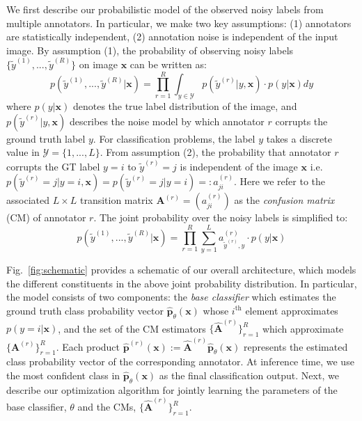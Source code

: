 We first describe our probabilistic model of the observed noisy labels from multiple annotators. In particular, we make two key assumptions: (1) annotators are statistically independent, (2) annotation noise is independent of the input image. By assumption (1), the probability of observing noisy labels $\{\tilde{y}^{(1)},...,\tilde{y}^{(R)}\}$ on image  $\textbf{x}$ can be written as:   
\begin{equation}\label{eq:general_likelihood}
p( \tilde{y}^{(1)},...,\tilde{y}^{(R)}|\textbf{x}) =  \prod_{r=1}^{R} \int_{y \in \mathcal{Y}}  p(\tilde{y}^{(r)}|y, \textbf{x}) \cdot p(y|\textbf{x}) dy
\end{equation}
where $p(y|\textbf{x})$ denotes the true label distribution of the image, and $ p(\tilde{y}^{(r)}|y, \textbf{x})$ describes the noise model by which annotator $r$ corrupts the ground truth label $y$. For classification problems, the label $y$ takes a discrete value in $\mathcal{Y}=\{1,...,L\}$.  From assumption (2), the probability that annotator  $r$ corrupts the GT label $y=i$ to $\tilde{y}^{(r)} = j$  is independent of the image $\mathbf{x}$ i.e. $ p(\tilde{y}^{(r)}=j|y=i, \textbf{x}) =  p(\tilde{y}^{(r)}=j|y=i) =: a^{(r)}_{ji} $. Here we refer to the associated $L \times L$ transition matrix $\mathbf{A}^{(r)} = (a^{(r)}_{ji}) $ as the \textit{confusion matrix} (CM) of annotator $r$. The joint probability over the noisy labels is simplified to: 
\begin{equation}\label{eq:model_likelihood}
p( \tilde{y}^{(1)},...,\tilde{y}^{(R)}|\textbf{x}) =  \prod_{r=1}^{R} \sum_{y = 1}^{L}  a^{(r)}_{\tilde{y}^{(r)}, y} \cdot p(y|\textbf{x})
\end{equation}

Fig.~\ref{fig:schematic} provides a schematic of our overall architecture, which models the different constituents in the above joint probability distribution. In particular, the model consists of two components: the \textit{base classifier} which estimates the ground truth class probability vector $\hat{\mathbf{p}}_{\theta}(\mathbf{x})$ whose $i^\text{th}$ element approximates $p(y=i|\textbf{x})$, and the set of the CM estimators $\{\hat{\mathbf{A}}^{(r)}\}_{r=1}^R$ which approximate $\{\mathbf{A}^{(r)}\}_{r=1}^R$. Each product $\hat{\mathbf{p}}^{(r)}(\mathbf{x}) :=\hat{\mathbf{A}}^{(r)}\hat{\mathbf{p}}_{\theta}(\mathbf{x})$ represents the estimated class probability vector of the corresponding annotator. At inference time, we use the most confident class in $\hat{\mathbf{p}}_{\theta}(\mathbf{x})$ as the final classification output. Next, we describe our optimization algorithm for jointly learning the parameters of the base classifier, $\theta$ and the CMs, $\{\hat{\mathbf{A}}^{(r)}\}_{r=1}^R$.



